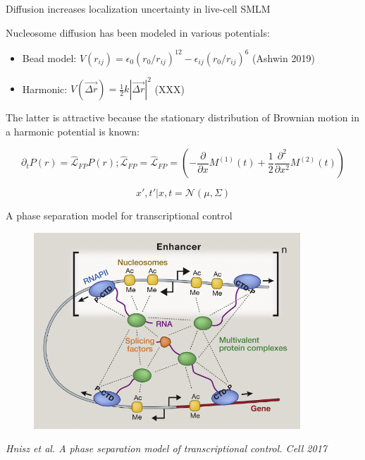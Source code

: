 \documentclass{beamer}					%
\begin{document}
\begin{frame}{Diffusion increases localization uncertainty in live-cell SMLM}

Nucleosome diffusion has been modeled in various potentials:
\vspace{0.1in}
\begin{itemize}
\item Bead model: $V(r_{ij}) = \epsilon_{0}(r_{0}/r_{ij})^{12}-\epsilon_{ij}(r_{0}/r_{ij})^{6}$ (Ashwin 2019)
\item Harmonic: $V(\vec{\Delta r}) = \frac{1}{2}k|\vec{\Delta r}|^{2}$ (XXX)
\end{itemize}
\vspace{0.1in}
The latter is attractive because the stationary distribution of Brownian motion in a harmonic potential is known:


\begin{equation*}
\partial_{t}P(r) = \hat{\mathcal{L}}_{FP}P(r); \hat{\mathcal{L}}_{FP} = \hat{\mathcal{L}}_{FP} = \left(-\frac{\partial}{\partial x}M^{(1)}(t) + \frac{1}{2}\frac{\partial^{2}}{\partial x^{2}}M^{(2)}(t)\right)
\end{equation*}


\begin{equation*}
x',t'|x,t = \mathcal{N}(\mu,\Sigma)
\end{equation*}

\end{frame}

\begin{frame}{A phase separation model for transcriptional control}
\begin{figure}
\includegraphics[width=10cm]{Super1.png}
\end{figure}
\textit{Hnisz et al. A phase separation model of transcriptional control. Cell 2017}
\end{frame}
\end{document}
